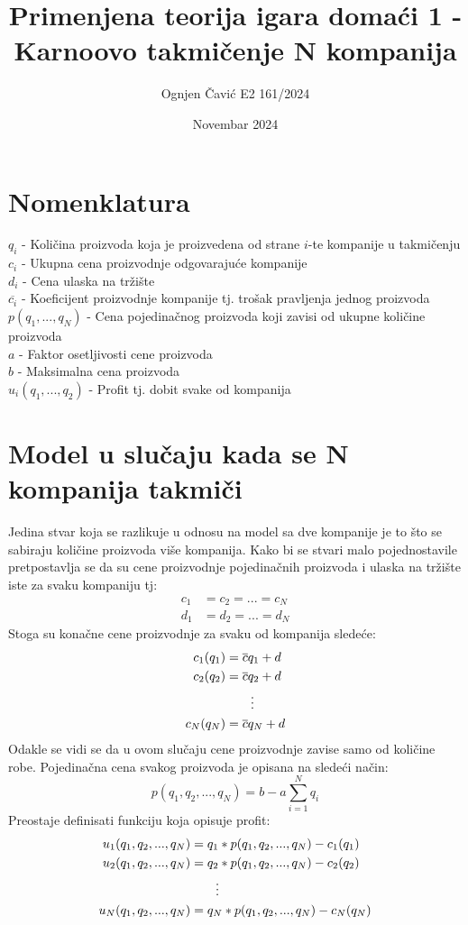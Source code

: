 \documentclass[12pt]{article}
\title{Primenjena teorija igara domaći 1 - Karnoovo takmičenje N kompanija}
\author{Ognjen Čavić E2 161/2024}
\date{Novembar 2024}
\begin{document}
\maketitle
\section{Nomenklatura}
\noindent
$q_i$ - Količina proizvoda koja je proizvedena od strane $i$-te kompanije u
takmičenju \\[0.2cm]
$c_i$ - Ukupna cena proizvodnje odgovarajuće kompanije \\[0.2cm]
$d_i$ - Cena ulaska na tržište \\[0.2cm]
$\overline{c_i}$ - Koeficijent proizvodnje kompanije tj. trošak pravljenja
jednog proizvoda \\[0.2cm]
$p(q_1,..., q_N)$ - Cena pojedinačnog proizvoda koji zavisi od ukupne količine
proizvoda \\[0.2cm]
$a$ - Faktor osetljivosti cene proizvoda \\[0.2cm]
$b$ - Maksimalna cena proizvoda \\[0.2cm]
$u_i(q_1,..., q_2)$ - Profit tj. dobit svake od kompanija
\section{Model u slučaju kada se N kompanija takmiči}
\par Jedina stvar koja se razlikuje u odnosu na model sa dve kompanije je to
što se sabiraju količine proizvoda više kompanija.
Kako bi se stvari malo pojednostavile pretpostavlja se da su cene proizvodnje
pojedinačnih proizvoda i ulaska na tržište iste za svaku kompaniju tj:
\begin{align*}
	c_1 &= c_2 = ... = c_N \\
	d_1 &= d_2 = ... = d_N 
\end{align*}
Stoga su konačne cene proizvodnje za svaku od kompanija sledeće:
\begin{align*}
	c_1(q_1) &= \overline{c} q_1 + d \\
	c_2(q_2) &= \overline{c} q_2 + d \\
		&\hspace{0.7cm}\vdots \\
	c_N(q_N) &= \overline{c} q_N + d 
\end{align*}
Odakle se vidi se da u ovom slučaju cene proizvodnje zavise samo od količine
robe.
Pojedinačna cena svakog proizvoda je opisana na sledeći način:
\begin{equation}
	p(q_1, q_2, ..., q_N) = b - a \sum_{i=1}^N q_i
\end{equation}
Preostaje definisati funkciju koja opisuje profit:
\begin{align*}
	u_1(q_1, q_2, ..., q_N) &= q_1 * p(q_1, q_2, ..., q_N) - c_1(q_1) \\
	u_2(q_1, q_2, ..., q_N) &= q_2 * p(q_1, q_2, ..., q_N) - c_2(q_2) \\
		&\hspace{0.7cm}\vdots \\
	u_N(q_1, q_2, ..., q_N) &= q_N * p(q_1, q_2, ..., q_N) - c_N(q_N)
\end{align*}
\end{document}
